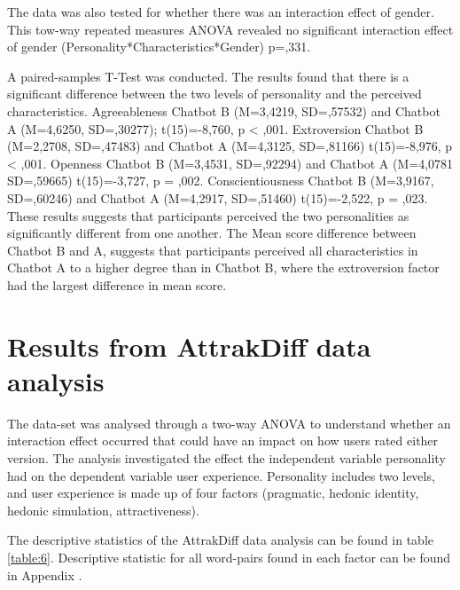 The data was also tested for whether there was an interaction effect of gender. This tow-way repeated measures ANOVA revealed no significant interaction effect of gender (Personality*Characteristics*Gender) p=,331.

A paired-samples T-Test was conducted. The results found that there is a significant difference between the two levels of personality and the perceived characteristics. Agreeableness Chatbot B (M=3,4219, SD=,57532) and Chatbot A (M=4,6250, SD=,30277); t(15)=-8,760, p < ,001. Extroversion Chatbot B (M=2,2708, SD=,47483) and Chatbot A (M=4,3125, SD=,81166) t(15)=-8,976, p < ,001. Openness Chatbot B (M=3,4531, SD=,92294) and Chatbot A (M=4,0781 SD=,59665) t(15)=-3,727, p = ,002. Conscientiousness Chatbot B (M=3,9167, SD=,60246) and Chatbot A (M=4,2917, SD=,51460) t(15)=-2,522, p = ,023. These results suggests that participants perceived the two personalities as significantly different from one another. The Mean score difference between Chatbot B and A, suggests that participants perceived all characteristics in Chatbot A to a higher degree than in Chatbot B, where the extroversion factor had the largest difference in mean score.

\section{Results from AttrakDiff data analysis }
        
The data-set was analysed through a two-way ANOVA to understand whether an interaction effect occurred that could have an impact on how users rated either version. The analysis investigated the effect the independent variable personality had on the dependent variable user experience. Personality includes two levels, and user experience is made up of four factors (pragmatic, hedonic identity, hedonic simulation, attractiveness).

The descriptive statistics of the AttrakDiff data analysis can be found in table \ref{table:6}. Descriptive statistic for all word-pairs found in each factor can be found in Appendix .

